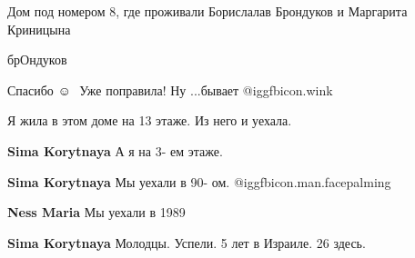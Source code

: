  
 
 
 
 


Дом под номером 8, где проживали Борислалав Брондуков и Маргарита Криницына

брОндуков

Спасибо ☺ ️ Уже поправила! Ну ...бывает @igg{fbicon.wink} 

Я жила в этом доме на 13 этаже. Из него и уехала.

\textbf{Sima Korytnaya}
А я на 3- ем этаже.

\textbf{Sima Korytnaya}
Мы уехали в 90- ом.  @igg{fbicon.man.facepalming} 

\textbf{Ness Maria} Мы уехали в 1989

\textbf{Sima Korytnaya}
Молодцы. Успели.
5 лет в Израиле.
26 здесь.
